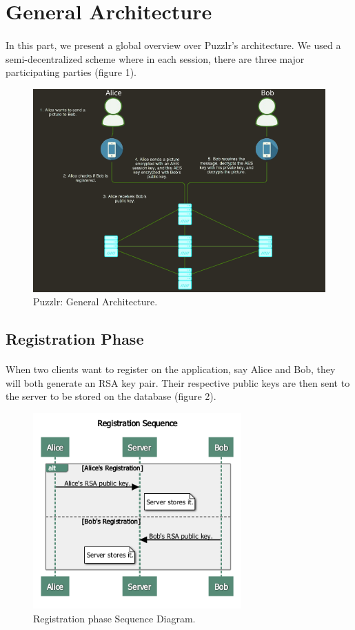 \section{General Architecture}
    \paragraph{}
    In this part, we present a global overview over Puzzlr's architecture. We used a semi-decentralized scheme where in each session, there are three major participating parties (figure 1).
      \begin{figure}[H]   
	\centering
	\includegraphics[width=16cm]{images/architecture/architecture}
	\caption{Puzzlr: General Architecture.}
	\label{Figure 1}
      \end{figure}
      \subsection{Registration Phase}
      
	\paragraph{}
	  When two clients want to register on the application, say Alice and Bob, they will both generate an RSA key pair. Their respective public keys are then sent to the server to be stored on the database (figure 2).
	  
	  \begin{figure}[H]  
	    \centering
	    \includegraphics[width=8cm]{images/architecture/registrationsequence}
	    \caption{Registration phase Sequence Diagram.}
	  \end{figure}
